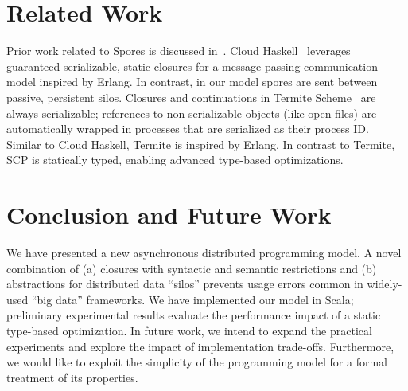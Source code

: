 \documentclass{easychair}
\begin{document}
\section{Related Work}


Prior work related to Spores is discussed in~\cite{MillerHO14}. Cloud
Haskell~\cite{CloudHaskell} leverages guaranteed-serializable, static closures
for a message-passing communication model inspired by Erlang. In contrast, in
our model spores are sent between passive, persistent silos. Closures and
continuations in Termite Scheme~\cite{Termite} are always serializable;
references to non-serializable objects (like open files) are automatically
wrapped in processes that are serialized as their process ID. Similar to Cloud
Haskell, Termite is inspired by Erlang. In contrast to Termite, SCP is statically typed,
enabling advanced type-based optimizations.



\section{Conclusion and Future Work}
\label{sec:conclusion}

We have presented a new asynchronous distributed programming model.
A novel combination of (a) closures with syntactic and semantic restrictions and
(b) abstractions for distributed data ``silos'' prevents usage errors common in
widely-used ``big data'' frameworks.
We have implemented our model in Scala; preliminary experimental
results evaluate the performance impact of a static type-based optimization. In
future work, we intend to expand the practical
experiments and explore the impact of implementation trade-offs. Furthermore, we would
like to exploit the simplicity of the programming model for a formal treatment of its
properties.


%
\begin{spacing}{0.9}


\end{spacing}
\end{document}
